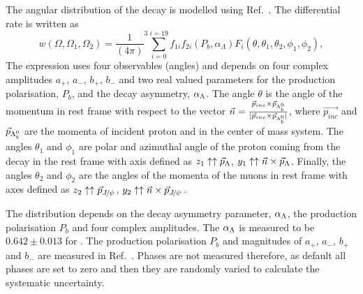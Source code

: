 %
%
The angular distribution of the \Lb\ra\jpsi\Lz decay is modelled using Ref.~\cite{Hrivnac:1994jx}.
The differential rate is written as
%
    \begin{equation}\label{eq:jpsiLambdaRate}
       w(\Omega ,\Omega_{1}, \Omega_{2}) =  {\frac{1}{(4\pi)}^{3}}
       \sum_{i=0}^{i=19} f_{1i} f_{2i}(P_{b} ,\alpha_{\Lambda}) F_{i}(\theta,
       \theta_{1},\theta_{2},\phi_{1},\phi_{2}),
      \end{equation}
The expression uses four observables (angles) and depends on four complex amplitudes $a_+$, $a_-$, $b_+$, $b_-$ and two
real valued parameters for the production polarisation, $P_b$, and the \Lz decay asymmetry, $\alpha_\Lambda$.
The angle $\theta$ is the angle of the \Lz momentum in \Lb rest frame with respect to
the vector $\vec{n}=\frac{\vec{p}_{inc} \times \vec{p}_{\Lambda^0_b}} { |\vec{p}_{inc} \times \vec{p}_{\Lambda^0_b}|}$, where
$\vec{p_{inc}}$ and $\vec{p}_{\Lambda^0_b}$ are the momenta of incident proton and \Lb in the center of mass system.
The angles $\theta_1$ and $\phi_1$ are polar and azimuthal angle of the proton coming from the \Lz decay
in the \Lz rest frame with axis defined as
    $z_{1}\uparrow\uparrow\vec{p}_{\Lambda}$,
    $y_{1}\uparrow\uparrow\vec{n}\times\vec{p}_{\Lambda}$.
Finally, the angles $\theta_2$ and $\phi_2$ are the angles of the momenta of the muons in \jpsi rest frame
with axes defined as 
    $z_{2}\uparrow\uparrow\vec{p}_{\jpsi}$,
    $y_{2}\uparrow\uparrow\vec{n}\times\vec{p}_{\jpsi}$.

The distribution depends on the \Lz decay asymmetry parameter, $\alpha_\Lambda$, the production polarisation
$P_b$ and four complex amplitudes. The $\alpha_\Lambda$ is measured to be $0.642 \pm 0.013$ for \Lz.
The production polarisation $P_b$ and magnitudes of $a_+$, $a_-$, $b_+$ and $b_-$ are measured in
Ref.~\cite{LHCb-PAPER-2012-057}. Phases are not measured therefore, as default all phases are set to
zero and then they are randomly varied to calculate the systematic uncertainty.



